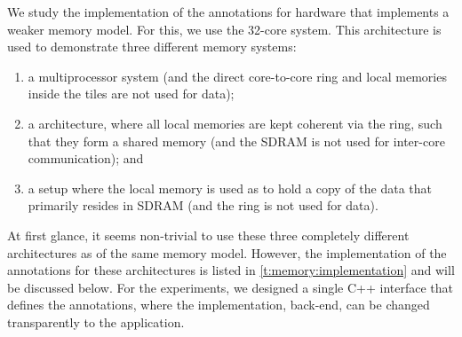 We study the implementation of the annotations for hardware that implements a weaker memory model.
For this, we use the 32-core \Starburst* system.
This architecture is used to demonstrate three different memory systems:
\begin{enumerate}
\item a  multiprocessor system (and the direct core-to-core ring and local memories inside the tiles are not used for data);
\item a  architecture, where all local memories are kept coherent via the ring, such that they form a shared memory (and the \ac{SDRAM} is not used for inter-core communication); and
\item a setup where the local memory is used as  to hold a copy of the data that primarily resides in \ac{SDRAM} (and the ring is not used for data).
\end{enumerate}

At first glance, it seems non-trivial to use these three completely different architectures as  of the same memory model.
However, the implementation of the annotations for these architectures is listed in \vref{t:memory:implementation} and will be discussed below.
For the experiments, we designed a single C++ interface that defines the annotations, where the implementation, \ie back-end, can be changed transparently to the application.

